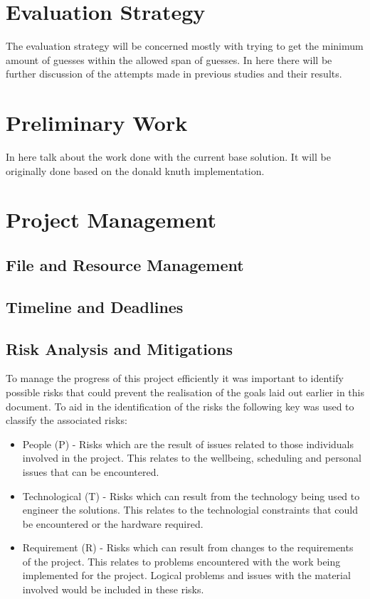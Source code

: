 \documentclass[12pt]{article}  %
\theoremstyle{definition}
\theoremstyle{remark}
\begin{document}
\section{Evaluation Strategy}\label{ss:back}

The evaluation strategy will be concerned mostly with trying to get the minimum amount of guesses within the allowed span of guesses.
In here there will be further discussion of the attempts made in previous studies and their results.

\newpage
\section {Preliminary Work}

In here talk about the work done with the current base solution. It will be originally done based on the donald knuth implementation.


\newpage                     %
\section{Project Management}\label{ss:back}

\subsection {File and Resource Management}

\subsection {Timeline and Deadlines}

\subsection {Risk Analysis and Mitigations}

To manage the progress of this project efficiently it was important to identify possible risks that could prevent the realisation of the goals laid out earlier in this document. To aid in the identification of the risks the following key was used to classify the associated risks:
\begin{itemize}
\item{People (P) - Risks which are the result of issues related to those individuals involved in the project. This relates to the wellbeing, scheduling and personal issues that can be encountered.}
\item{Technological (T) - Risks which can result from the technology being used to engineer the solutions. This relates to the technologial constraints that could be encountered or the hardware required.}
\item{Requirement (R)  - Risks which can result from changes to the requirements of the project. This relates to problems encountered with the work being implemented for the project. Logical problems and issues with the material involved would be included in these risks.}
\end{itemize}
\end{document}
